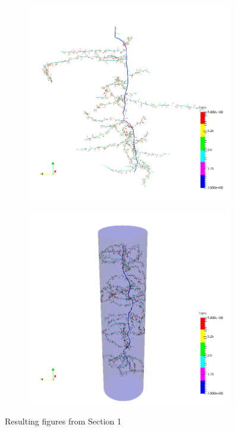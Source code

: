 \documentclass[a4paper]{article}
\begin{document}
\begin{figure}
\begin{subfigure}[c]{0.5\textwidth}
\includegraphics[width=0.99\textwidth]{example_1a.png}
 \label{fig:basicA}
\end{subfigure}
\begin{subfigure}[c]{0.5\textwidth}
\includegraphics[width=0.99\textwidth]{example_1b.png}
 \label{fig:basicB}
\end{subfigure}
\caption{Resulting figures from Section 1} 
\end{figure}
\end{document}
